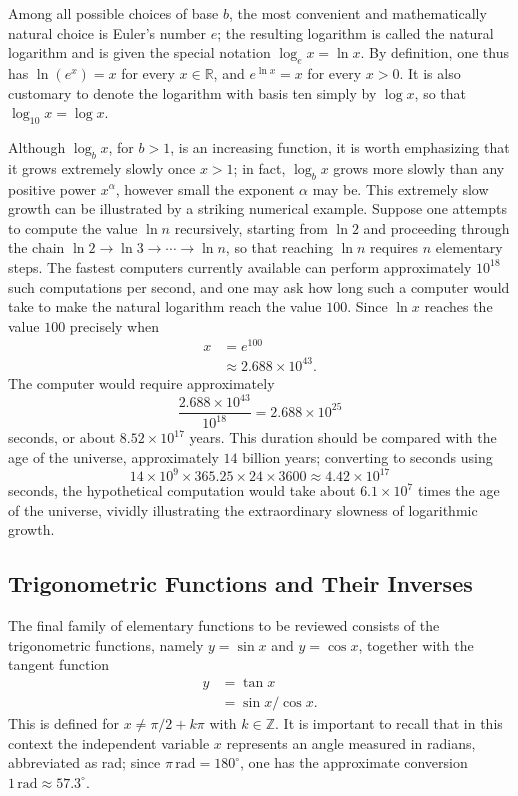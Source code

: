Among all possible choices of base $b$, the most convenient and mathematically natural choice is Euler's number $e$; the resulting logarithm is called the natural logarithm and is given the special notation $\log_e x = \ln x$. By definition, one thus has $\ln(e^x) = x$ for every $x \in \mathbb{R}$, and $e^{\ln x} = x$ for every $x > 0$. It is also customary to denote the logarithm with basis ten simply by $\log x$, so that $\log_{10} x = \log x$.

Although $\log_b x$, for $b > 1$, is an increasing function, it is worth emphasizing that it grows extremely slowly once $x > 1$; in fact, $\log_b x$ grows more slowly than any positive power $x^\alpha$, however small the exponent $\alpha$ may be. This extremely slow growth can be illustrated by a striking numerical example. Suppose one attempts to compute the value $\ln n$ recursively, starting from $\ln 2$ and proceeding through the chain $\ln 2 \to \ln 3 \to \cdots \to \ln n$, so that reaching $\ln n$ requires $n$ elementary steps. The fastest computers currently available can perform approximately $10^{18}$ such computations per second, and one may ask how long such a computer would take to make the natural logarithm reach the value $100$. Since $\ln x$ reaches the value $100$ precisely when
\[
\begin{aligned}
x &= e^{100} \\
&\approx 2.688\times10^{43}.
\end{aligned}
\]
The computer would require approximately
\[
\frac{2.688\times10^{43}}{10^{18}}=2.688\times10^{25}
\]
 seconds, or about $8.52\times10^{17}$ years. This duration should be compared with the age of the universe, approximately $14$ billion years; converting to seconds using
\[
14 \times 10^9 \times 365.25 \times 24 \times 3600 \approx 4.42 \times 10^{17}
\]
 seconds, the hypothetical computation would take about $6.1\times10^7$ times the age of the universe, vividly illustrating the extraordinary slowness of logarithmic growth.

\subsection{Trigonometric Functions and Their Inverses}

The final family of elementary functions to be reviewed consists of the trigonometric functions, namely $y = \sin x$ and $y = \cos x$, together with the tangent function
\[
\begin{aligned}
y &= \tan x \\
&= \sin x / \cos x.
\end{aligned}
\]
This is defined for $x \neq \pi/2 + k\pi$ with $k \in \mathbb{Z}$. It is important to recall that in this context the independent variable $x$ represents an angle measured in radians, abbreviated as rad; since $\pi \, \text{rad} = 180^\circ$, one has the approximate conversion $1 \, \text{rad} \approx 57.3^\circ$.

